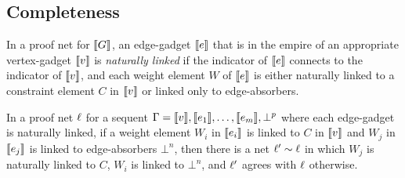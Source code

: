 \documentclass[conference,onecolumn]{IEEEtran}
\begin{document}

\subsection*{Completeness}


In a proof net for $\llbracket G\rrbracket$, an edge-gadget $\llbracket e\rrbracket$ that is in the empire of an appropriate vertex-gadget $\llbracket v\rrbracket$ is \emph{naturally linked} if the indicator of $\llbracket e\rrbracket$ connects to the indicator of $\llbracket v\rrbracket$, and each weight element $W$ of $\llbracket e\rrbracket$ is either naturally linked to a constraint element $C$ in $\llbracket v\rrbracket$ or linked only to edge-absorbers.

\begin{lemma}
\label{lem:octopus roll}
In a proof net $\ell$ for a sequent $\Gamma=\llbracket v\rrbracket,\llbracket e_1\rrbracket,\dotsc,\llbracket e_m\rrbracket,\bot^p$ where each edge-gadget is naturally linked, if a weight element $W_i$ in $\llbracket e_i\rrbracket$ is linked to $C$ in $\llbracket v\rrbracket$ and $W_j$ in $\llbracket e_j\rrbracket$ is linked to edge-absorbers $\bot^n$, then there is a net $\ell'\sim\ell$ in which $W_j$ is naturally linked to $C$, $W_i$ is linked to $\bot^n$, and $\ell'$ agrees with $\ell$ otherwise.
\end{lemma}
\end{document}
